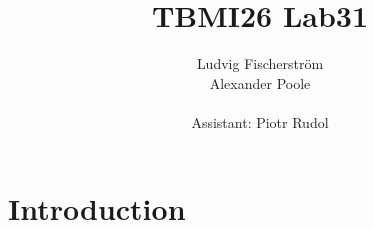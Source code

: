 \documentclass[a4paper,12pt]{article}
\title{TBMI26 Lab31}
\author{Ludvig Fischerstr\"{o}m \\Alexander Poole\\ \\Assistant: Piotr Rudol}
\begin{document}
\maketitle
	\thispagestyle{empty}
\newpage


\section*{Introduction}
\end{document}
